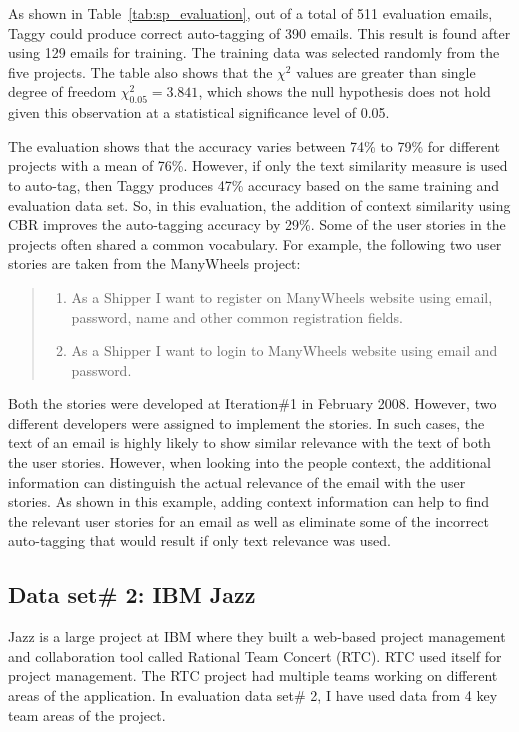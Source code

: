 As shown in Table~\ref{tab:sp_evaluation}, out of a total of 511 evaluation emails, Taggy could produce correct auto-tagging of 390 emails. This result is found after using 129 emails for training. The training data was selected randomly from the five projects. The table also shows that the $\chi^{2}$ values are greater than single degree of freedom $\chi^{2}_{0.05} = 3.841$, which shows the null hypothesis does not hold given this observation at a statistical significance level of 0.05.

The evaluation shows that the accuracy varies between 74\% to 79\% for different projects with a mean of 76\%. However, if only the text similarity measure is used to auto-tag, then Taggy produces 47\% accuracy based on the same training and evaluation data set. So, in this evaluation, the addition of context similarity using CBR improves the auto-tagging accuracy by 29\%. Some of the user stories in the projects often shared a common vocabulary. For example, the following two user stories are taken from the ManyWheels project:

\begin{quote}
	\begin{enumerate}
		\item As a Shipper I want to register on ManyWheels website using email, password, name and other common registration fields.
		\item As a Shipper I want to login to ManyWheels website using email and password.
	\end{enumerate}
\end{quote}

Both the stories were developed at Iteration\#1 in February 2008. However, two different developers were assigned to implement the stories. In such cases, the text of an email is highly likely to show similar relevance with the text of both the user stories. However, when looking into the people context, the additional information can distinguish the actual relevance of the email with the user stories. As shown in this example, adding context information can help to find the relevant user stories for an email as well as eliminate some of the incorrect auto-tagging that would result if only text relevance was used.

\subsection{Data set\# 2: IBM Jazz}
Jazz is a large project at IBM where they built a web-based project management and collaboration tool called Rational Team Concert (RTC). RTC used itself for project management. The RTC project had multiple teams working on different areas of the application. In evaluation data set\# 2, I have used data from 4 key team areas of the project.

